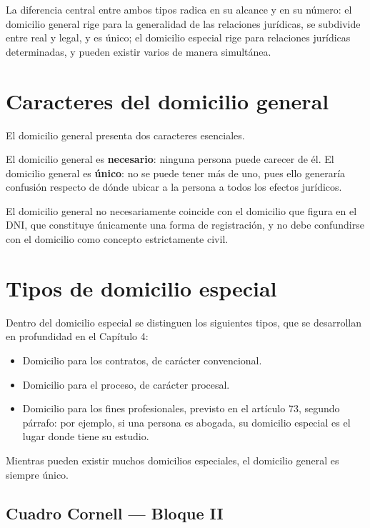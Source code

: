 \documentclass[12pt,oneside]{book}
\begin{document}
La diferencia central entre ambos tipos radica en su alcance y en su número: el domicilio general rige para la generalidad de las relaciones jurídicas, se subdivide entre real y legal, y es único; el domicilio especial rige para relaciones jurídicas determinadas, y pueden existir varios de manera simultánea.

\section{Caracteres del domicilio general}

El domicilio general presenta dos caracteres esenciales.

\begin{important}
El domicilio general es \textbf{necesario}: ninguna persona puede carecer de él. El domicilio general es \textbf{único}: no se puede tener más de uno, pues ello generaría confusión respecto de dónde ubicar a la persona a todos los efectos jurídicos.
\end{important}

El domicilio general no necesariamente coincide con el domicilio que figura en el DNI, que constituye únicamente una forma de registración, y no debe confundirse con el domicilio como concepto estrictamente civil.

\section{Tipos de domicilio especial}

Dentro del domicilio especial se distinguen los siguientes tipos, que se desarrollan en profundidad en el Capítulo 4:

\begin{itemize}
    \item Domicilio para los contratos, de carácter convencional.
    \item Domicilio para el proceso, de carácter procesal.
    \item Domicilio para los fines profesionales, previsto en el artículo 73, segundo párrafo: por ejemplo, si una persona es abogada, su domicilio especial es el lugar donde tiene su estudio.
\end{itemize}

Mientras pueden existir muchos domicilios especiales, el domicilio general es siempre único.

\subsection*{Cuadro Cornell --- Bloque II}
\end{document}
